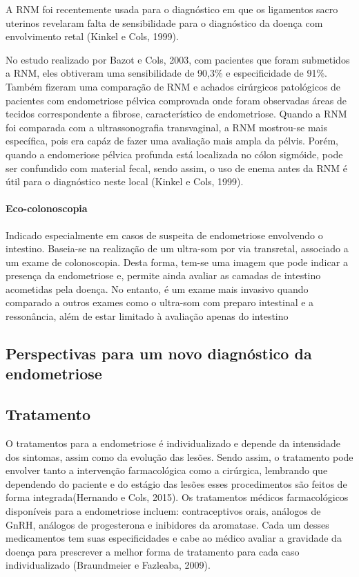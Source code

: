 \documentclass[12pt]{article} %
\begin{document}
A RNM foi recentemente usada para o diagnóstico em que os ligamentos
sacro uterinos revelaram falta de sensibilidade para o diagnóstico da
doença com envolvimento retal (Kinkel e Cols, 1999). %

No estudo realizado por Bazot e Cols, 2003, com pacientes que foram
submetidos a RNM, eles obtiveram uma sensibilidade de 90,3\% e
especificidade de 91\%. Também fizeram uma comparação de RNM e
achados cirúrgicos patológicos de pacientes com endometriose pélvica
comprovada onde foram observadas áreas de tecidos correspondente a
fibrose, característico de endometriose. Quando a RNM foi comparada
com a ultrassonografia transvaginal, a RNM mostrou-se mais específica,
pois era capáz de fazer uma avaliação mais ampla da pélvis. Porém,
quando a endomeriose pélvica profunda está localizada no cólon
sigmóide, pode ser confundido com material fecal, sendo assim, o uso
de enema antes da RNM é útil para o diagnóstico neste local (Kinkel e
Cols, 1999).


\paragraph{Eco-colonoscopia}

Indicado especialmente em casos de suspeita de endometriose envolvendo
o intestino. Baseia-se na realização de um ultra-som por via
transretal, associado a um exame de colonoscopia. Desta forma, tem-se
uma imagem que pode indicar a presença da endometriose e, permite
ainda avaliar as camadas de intestino acometidas pela doença. No
entanto, é um exame mais invasivo quando comparado a outros exames como
o ultra-som com preparo intestinal e a ressonância, além de estar
limitado à avaliação apenas do intestino

\subsection{Perspectivas para um novo diagnóstico da endometriose}




\subsection{Tratamento} 

O tratamentos para a endometriose é individualizado e depende da
intensidade dos sintomas, assim como da evolução das lesões. Sendo
assim, o tratamento pode envolver tanto a intervenção farmacológica
como a cirúrgica, lembrando que dependendo do paciente e do estágio
das lesões esses procedimentos são feitos de forma integrada(Hernando
e Cols, 2015). Os tratamentos médicos farmacológicos disponíveis para
a endometriose incluem: contraceptivos orais, análogos de GnRH,
análogos de progesterona e inibidores da aromatase. Cada um desses
medicamentos tem suas especificidades e cabe ao médico avaliar a
gravidade da doença para prescrever a melhor forma de tratamento para
cada caso individualizado (Braundmeier e Fazleaba, 2009).
\end{document}
